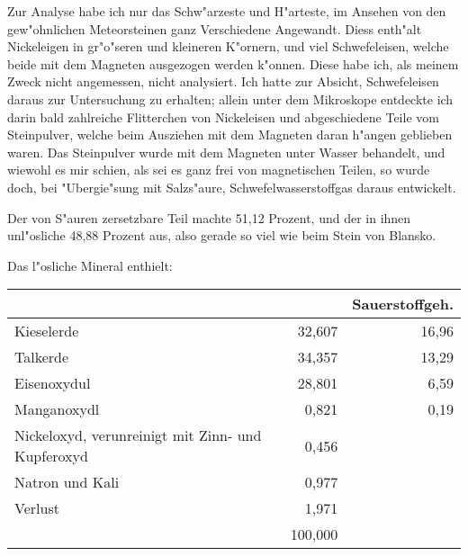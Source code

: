 \documentclass[a4paper, 11pt, oneside]{article}
\begin{document}
Zur Analyse habe ich nur das Schw"arzeste und H"arteste, im Ansehen von den gew"ohnlichen Meteorsteinen ganz Verschiedene Angewandt. Diess enth"alt Nickeleigen in gr"o"seren und kleineren K"ornern, und viel Schwefeleisen, welche beide mit dem Magneten ausgezogen werden k"onnen. Diese habe ich, als meinem Zweck nicht angemessen, nicht analysiert. Ich hatte zur Absicht, Schwefeleisen daraus zur Untersuchung zu erhalten; allein unter dem Mikroskope entdeckte ich darin bald zahlreiche Flitterchen von Nickeleisen und abgeschiedene Teile vom Steinpulver, welche beim Ausziehen mit dem Magneten daran h"angen geblieben waren. Das Steinpulver wurde mit dem Magneten unter Wasser behandelt, und wiewohl es mir schien, als sei es ganz frei von magnetischen Teilen, so wurde doch, bei "Ubergie"sung mit Salzs"aure, Schwefelwasserstoffgas daraus entwickelt.

Der von S"auren zersetzbare Teil machte 51,12 Prozent, und der in ihnen unl"osliche 48,88 Prozent aus, also gerade so viel wie beim Stein von Blansko.

Das l"osliche Mineral enthielt:
\begin{center}
\begin{tabular}{ |p{30mm}|r|r| }
    \hline
     &  & Sauerstoffgeh.\\\hline
    Kieselerde & 32,607 & 16,96\\\hline
    Talkerde & 34,357 & 13,29\\\hline
    Eisenoxydul & 28,801 & 6,59\\\hline
    Manganoxydl & 0,821 & 0,19\\\hline
    Nickeloxyd, verunreinigt mit Zinn- und Kupferoxyd & 0,456 & \\\hline
    Natron und Kali & 0,977 & \\\hline
    Verlust & 1,971 & \\\hline
    & 100,000 & \\
    \hline
\end{tabular}
\end{center}
\end{document}
